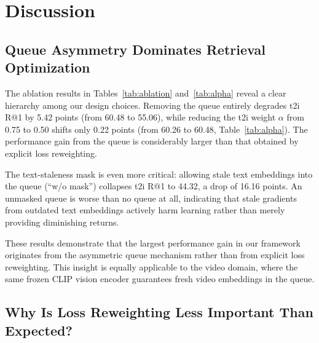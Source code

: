 \documentclass[10pt,leqno]{amsart}
\begin{document}
\section{Discussion}

\subsection{Queue Asymmetry Dominates Retrieval Optimization}

The ablation results in Tables~\ref{tab:ablation} and~\ref{tab:alpha} reveal a clear hierarchy among our design choices. Removing the queue entirely degrades t2i R@1 by 5.42 points (from 60.48 to 55.06), while reducing the t2i weight $\alpha$ from 0.75 to 0.50 shifts only 0.22 points (from 60.26 to 60.48, Table~\ref{tab:alpha}). The performance gain from the queue is considerably larger than that obtained by explicit loss reweighting.

The text-staleness mask is even more critical: allowing stale text embeddings into the queue (``w/o mask'') collapses t2i R@1 to 44.32, a drop of 16.16 points. An unmasked queue is worse than no queue at all, indicating that stale gradients from outdated text embeddings actively harm learning rather than merely providing diminishing returns.

These results demonstrate that the largest performance gain in our framework originates from the asymmetric queue mechanism rather than from explicit loss reweighting. This insight is equally applicable to the video domain, where the same frozen CLIP vision encoder guarantees fresh video embeddings in the queue.

\subsection{Why Is Loss Reweighting Less Important Than Expected?}
\end{document}
